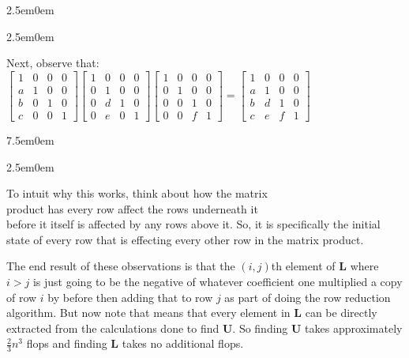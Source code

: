\documentclass{book}
\newcommand{\hFour}{%
   \color{Cerulean}
   \fontsize{12}{14}\selectfont%
}
\newenvironment{myIndent}{%
   \begin{adjustwidth}{2.5em}{0em}%
}{%
   \end{adjustwidth}%
}
\newenvironment{myTindent}{%
   \begin{adjustwidth}{7.5em}{0em}%
}{%
   \end{adjustwidth}%
}
\newcommand{\retTwo}{\hfill\bigbreak}
\newcommand{\mMat}[1]{\mathbf{#1}}
\begin{document}
\begin{myIndent}
{\begin{myIndent}
         Next, observe that: $\left[\begin{smallmatrix}
            1 & 0 & 0 & 0 \\
            a & 1 & 0 & 0 \\
            b & 0 & 1 & 0 \\
            c & 0 & 0 & 1
         \end{smallmatrix}\right]
         \left[\begin{smallmatrix}
            1 & 0 & 0 & 0 \\
            0 & 1 & 0 & 0 \\
            0 & d & 1 & 0 \\
            0 & e & 0 & 1
         \end{smallmatrix}\right]
         \left[\begin{smallmatrix}
            1 & 0 & 0 & 0 \\
            0 & 1 & 0 & 0 \\
            0 & 0 & 1 & 0 \\
            0 & 0 & f & 1
         \end{smallmatrix}\right] = \left[\begin{smallmatrix}
            1 & 0 & 0 & 0 \\
            a & 1 & 0 & 0 \\
            b & d & 1 & 0 \\
            c & e & f & 1
         \end{smallmatrix}\right]$

         {\begin{myTindent}\begin{myIndent} \hFour
            To intuit why this works, think about how the matrix \\product has every row affect the rows underneath it \\before it itself is affected by any rows above it. So, it is specifically the initial state of every row that is effecting every other row in the matrix product.
         \end{myIndent}\end{myTindent}} \retTwo

         The end result of these observations is that the $(i,j)$th element of $\mMat{L}$ where $i>j$ is just going to be the negative of whatever coefficient one multiplied a copy of row $i$ by before then adding that to row $j$ as part of doing the row reduction algorithm. But now note that means that every element in $\mMat{L}$ can be directly extracted from the calculations done to find $\mMat{U}$. So finding $\mMat{U}$ takes approximately $\frac{2}{3}n^3$ flops and finding $\mMat{L}$ takes no additional flops. \retTwo
      \end{myIndent}}


\end{myIndent}
\end{document}
